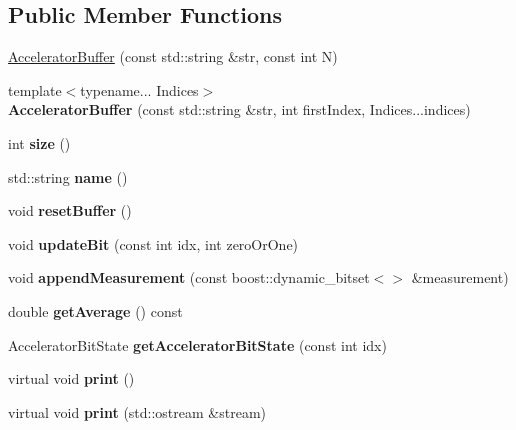 \subsection*{Public Member Functions}
\begin{DoxyCompactItemize}
\item 
\hyperlink{a00013_ab606d8af942120d60b51a4fffcd75c98}{Accelerator\+Buffer} (const std\+::string \&str, const int N)
\item 
{\footnotesize template$<$typename... Indices$>$ }\\{\bfseries Accelerator\+Buffer} (const std\+::string \&str, int first\+Index, Indices...\+indices)\hypertarget{a00013_ac550d89390562095c56aa1b14ae85001}{}\label{a00013_ac550d89390562095c56aa1b14ae85001}

\item 
int {\bfseries size} ()\hypertarget{a00013_aa2a3101c2e3ae3550172bf49f9587f3b}{}\label{a00013_aa2a3101c2e3ae3550172bf49f9587f3b}

\item 
std\+::string {\bfseries name} ()\hypertarget{a00013_ad5b646e9efc21b6d0bcc22cd6f649c22}{}\label{a00013_ad5b646e9efc21b6d0bcc22cd6f649c22}

\item 
void {\bfseries reset\+Buffer} ()\hypertarget{a00013_aa6d6e9cfee6170333c1f03507345743f}{}\label{a00013_aa6d6e9cfee6170333c1f03507345743f}

\item 
void {\bfseries update\+Bit} (const int idx, int zero\+Or\+One)\hypertarget{a00013_a4bc0edbe9aa0d463f67ddcc38265066f}{}\label{a00013_a4bc0edbe9aa0d463f67ddcc38265066f}

\item 
void {\bfseries append\+Measurement} (const boost\+::dynamic\+\_\+bitset$<$$>$ \&measurement)\hypertarget{a00013_ac161c4f984f774d08197871094aabc67}{}\label{a00013_ac161c4f984f774d08197871094aabc67}

\item 
double {\bfseries get\+Average} () const \hypertarget{a00013_a97cf3cc4e1aaa8ac3cee7817860f77c1}{}\label{a00013_a97cf3cc4e1aaa8ac3cee7817860f77c1}

\item 
Accelerator\+Bit\+State {\bfseries get\+Accelerator\+Bit\+State} (const int idx)\hypertarget{a00013_aba6ef359f3117faa98f0eb8da90d909e}{}\label{a00013_aba6ef359f3117faa98f0eb8da90d909e}

\item 
virtual void {\bfseries print} ()\hypertarget{a00013_add0835e188f0eda4f1b68a28ddc79786}{}\label{a00013_add0835e188f0eda4f1b68a28ddc79786}

\item 
virtual void {\bfseries print} (std\+::ostream \&stream)\hypertarget{a00013_a7c59462451223772b41ef232b06a7dfa}{}\label{a00013_a7c59462451223772b41ef232b06a7dfa}

\end{DoxyCompactItemize}
